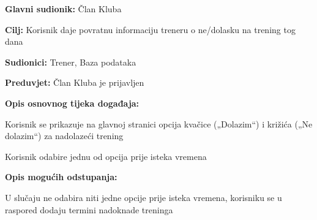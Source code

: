 \documentclass[times, utf8, zavrsni]{fer}
\newenvironment{packed_enum}{
	\begin{enumerate}
		\setlength{\itemsep}{0pt}
		\setlength{\parskip}{0pt}
		\setlength{\parsep}{0pt}
	}{\end{enumerate}}
\newenvironment{packed_item}{
	\begin{itemize}
		\setlength{\itemsep}{0pt}
		\setlength{\parskip}{0pt}
		\setlength{\parsep}{0pt}
	}{\end{itemize}}
\begin{document}
			\noindent {}
					\begin{packed_item}
						
						\item \textbf{Glavni sudionik: } Član Kluba
						\item  \textbf{Cilj:} Korisnik daje povratnu informaciju treneru o ne/dolasku na trening tog dana
						\item  \textbf{Sudionici:} Trener, Baza podataka
						\item  \textbf{Preduvjet:} Član Kluba je prijavljen
						\item  \textbf{Opis osnovnog tijeka događaja:}
						
						\item[] \begin{packed_enum}
							
							\item Korisnik se prikazuje na glavnoj stranici opcija kvačice („Dolazim“) i križića („Ne dolazim“) za nadolazeći trening
							\item Korisnik odabire jednu od opcija prije isteka vremena 
							
							
						\end{packed_enum}
						
						\item  \textbf{Opis mogućih odstupanja:}
						
						\item[] \begin{packed_enum}
							
							\item U slučaju ne odabira niti jedne opcije prije isteka vremena, korisniku se u raspored dodaju termini nadoknade treninga
							
						\end{packed_enum}
						
					\end{packed_item}
					
\end{document}
